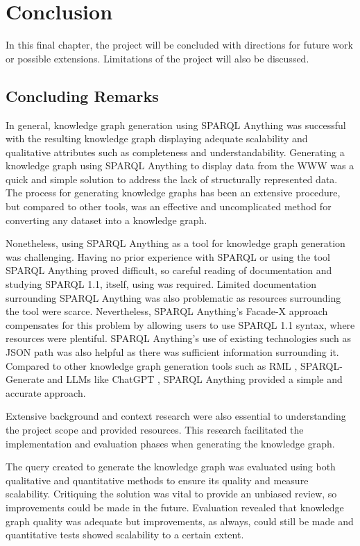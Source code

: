 \chapter{Conclusion}
In this final chapter, the project will be concluded with directions for future work or possible extensions. Limitations of the project will also be discussed. 

\section{Concluding Remarks}
\hspace{0.5cm} In general, knowledge graph generation using SPARQL Anything was successful with the resulting knowledge graph displaying adequate scalability and qualitative attributes such as completeness and understandability. Generating a knowledge graph using SPARQL Anything to display data from the WWW was a quick and simple solution to address the lack of structurally represented data. The process for generating knowledge graphs has been an extensive procedure, but compared to other tools, was an effective and uncomplicated method for converting any dataset into a knowledge graph. 

Nonetheless, using SPARQL Anything as a tool for knowledge graph generation was challenging. Having no prior experience with SPARQL or using the tool SPARQL Anything proved difficult, so careful reading of documentation \cite{sparqlanythinggithub} and studying SPARQL 1.1, itself, using \cite{sparlbook} was required. Limited documentation surrounding SPARQL Anything was also problematic as resources surrounding the tool were scarce. Nevertheless, SPARQL Anything's Facade-X approach compensates for this problem by allowing users to use SPARQL 1.1 syntax, where resources were plentiful. SPARQL Anything's use of existing technologies such as JSON path was also helpful as there was sufficient information surrounding it. Compared to other knowledge graph generation tools such as RML \cite{rml}, SPARQL-Generate \cite{sparqlgenerate} and LLMs like ChatGPT \cite{chatgptwebsite}, SPARQL Anything provided a simple and accurate approach. 

Extensive background and context research were also essential to understanding the project scope and provided resources. This research facilitated the implementation and evaluation phases when generating the knowledge graph. 

The query created to generate the knowledge graph was evaluated using both qualitative and quantitative methods to ensure its quality and measure scalability. Critiquing the solution was vital to provide an unbiased review, so improvements could be made in the future. Evaluation revealed that knowledge graph quality was adequate but improvements, as always, could still be made and quantitative tests showed scalability to a certain extent. 

